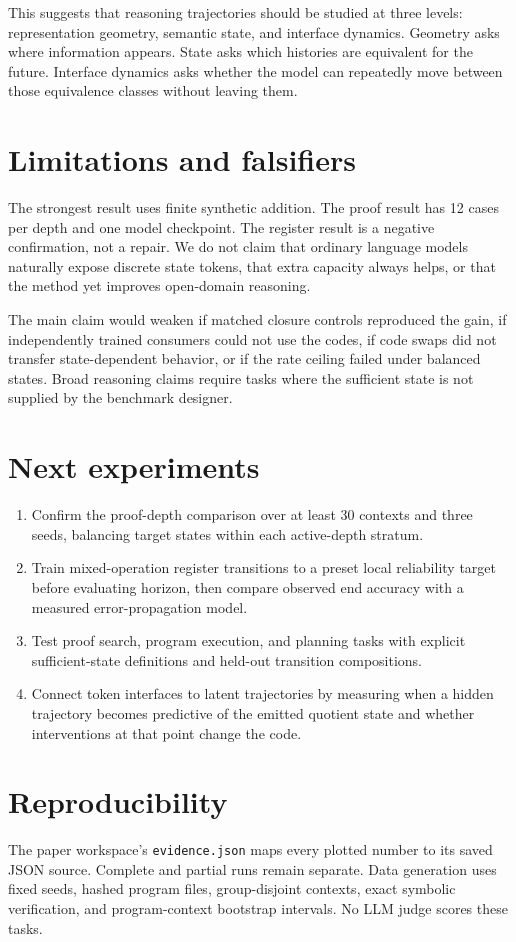 \documentclass[10pt]{article}
\begin{document}
This suggests that reasoning trajectories should be studied at three levels:
representation geometry, semantic state, and interface dynamics. Geometry asks
where information appears. State asks which histories are equivalent for the
future. Interface dynamics asks whether the model can repeatedly move between
those equivalence classes without leaving them.

\section{Limitations and falsifiers}

The strongest result uses finite synthetic addition. The proof result has 12
cases per depth and one model checkpoint. The register result is a negative
confirmation, not a repair. We do not claim that ordinary language models
naturally expose discrete state tokens, that extra capacity always helps, or
that the method yet improves open-domain reasoning.

The main claim would weaken if matched closure controls reproduced the gain,
if independently trained consumers could not use the codes, if code swaps did
not transfer state-dependent behavior, or if the rate ceiling failed under
balanced states. Broad reasoning claims require tasks where the sufficient
state is not supplied by the benchmark designer.

\section{Next experiments}

\begin{enumerate}
  \item Confirm the proof-depth comparison over at least 30 contexts and three
  seeds, balancing target states within each active-depth stratum.
  \item Train mixed-operation register transitions to a preset local reliability
  target before evaluating horizon, then compare observed end accuracy with a
  measured error-propagation model.
  \item Test proof search, program execution, and planning tasks with explicit
  sufficient-state definitions and held-out transition compositions.
  \item Connect token interfaces to latent trajectories by measuring when a
  hidden trajectory becomes predictive of the emitted quotient state and
  whether interventions at that point change the code.
\end{enumerate}

\section{Reproducibility}

The paper workspace's \texttt{evidence.json} maps every plotted number to its
saved JSON source. Complete and partial runs remain separate. Data generation
uses fixed seeds, hashed program files, group-disjoint contexts, exact symbolic
verification, and program-context bootstrap intervals. No LLM judge scores
these tasks.



\end{document}
